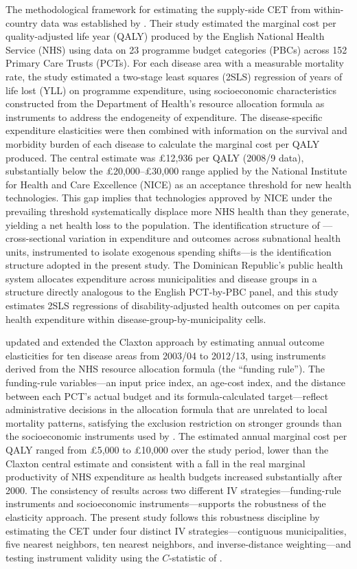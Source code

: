 \documentclass[11pt]{article}
\numberwithin{equation}{section}
\theoremstyle{remark}
\begin{document}
The methodological framework for estimating the supply-side CET from within-country data was established by \citet{Claxton2015}. Their study estimated the marginal cost per quality-adjusted life year (QALY) produced by the English National Health Service (NHS) using data on 23 programme budget categories (PBCs) across 152 Primary Care Trusts (PCTs). For each disease area with a measurable mortality rate, the study estimated a two-stage least squares (2SLS) regression of years of life lost (YLL) on programme expenditure, using socioeconomic characteristics constructed from the Department of Health's resource allocation formula as instruments to address the endogeneity of expenditure. The disease-specific expenditure elasticities were then combined with information on the survival and morbidity burden of each disease to calculate the marginal cost per QALY produced. The central estimate was \pounds12,936 per QALY (2008/9 data), substantially below the \pounds20,000--\pounds30,000 range applied by the National Institute for Health and Care Excellence (NICE) as an acceptance threshold for new health technologies. This gap implies that technologies approved by NICE under the prevailing threshold systematically displace more NHS health than they generate, yielding a net health loss to the population. The identification structure of \citet{Claxton2015}---cross-sectional variation in expenditure and outcomes across subnational health units, instrumented to isolate exogenous spending shifts---is the identification structure adopted in the present study. The Dominican Republic's public health system allocates expenditure across municipalities and disease groups in a structure directly analogous to the English PCT-by-PBC panel, and this study estimates 2SLS regressions of disability-adjusted health outcomes on per capita health expenditure within disease-group-by-municipality cells.

\citet{Martin2021} updated and extended the Claxton approach by estimating annual outcome elasticities for ten disease areas from 2003/04 to 2012/13, using instruments derived from the NHS resource allocation formula (the ``funding rule''). The funding-rule variables---an input price index, an age-cost index, and the distance between each PCT's actual budget and its formula-calculated target---reflect administrative decisions in the allocation formula that are unrelated to local mortality patterns, satisfying the exclusion restriction on stronger grounds than the socioeconomic instruments used by \citet{Claxton2015}. The estimated annual marginal cost per QALY ranged from \pounds5,000 to \pounds10,000 over the study period, lower than the Claxton central estimate and consistent with a fall in the real marginal productivity of NHS expenditure as health budgets increased substantially after 2000. The consistency of results across two different IV strategies---funding-rule instruments and socioeconomic instruments---supports the robustness of the elasticity approach. The present study follows this robustness discipline by estimating the CET under four distinct IV strategies---contiguous municipalities, five nearest neighbors, ten nearest neighbors, and inverse-distance weighting---and testing instrument validity using the $C$-statistic of \citet{K.Newey1985}.
\end{document}
